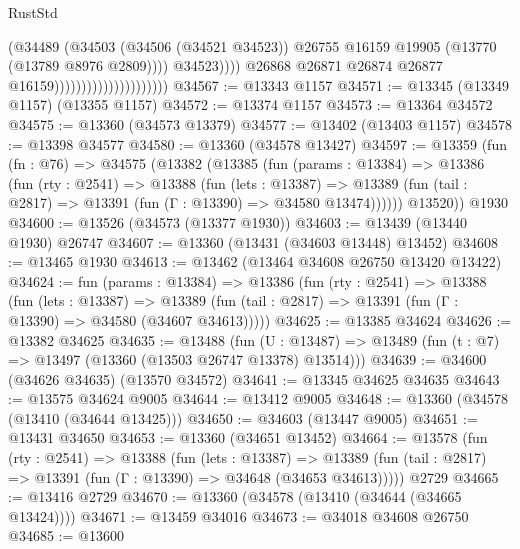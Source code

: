 \begin{lexlean}{RustStd}
\begin{coremodule}
                                                      (@34489
                                                        (@34503
                                                          (@34506 (@34521 @34523))
                                                          @26755
                                                          @16159
                                                          @19905
                                                          (@13770 (@13789 @8976 @2809))))
                                                      @34523))))
                                              @26868
                                              @26871
                                              @26874
                                              @26877
                                              @16159)))))))))))))))))))))
@34567 := @13343 @1157
@34571 := @13345 (@13349 @1157) (@13355 @1157)
@34572 := @13374 @1157
@34573 := @13364 @34572
@34575 := @13360 (@34573 @13379)
@34577 := @13402 (@13403 @1157)
@34578 := @13398 @34577
@34580 := @13360 (@34578 @13427)
@34597 := @13359
    (fun (fn : @76) =>
    @34575
      (@13382
        (@13385
          (fun (params : @13384) =>
          @13386
            (fun (rty : @2541) =>
            @13388
              (fun (lets : @13387) =>
              @13389 (fun (tail : @2817) => @13391 (fun (Γ : @13390) => @34580 @13474))))))
        @13520))
    @1930
@34600 := @13526 (@34573 (@13377 @1930))
@34603 := @13439 (@13440 @1930) @26747
@34607 := @13360 (@13431 (@34603 @13448) @13452)
@34608 := @13465 @1930
@34613 := @13462 (@13464 @34608 @26750 @13420 @13422)
@34624 := fun (params : @13384) =>
  @13386
    (fun (rty : @2541) =>
    @13388
      (fun (lets : @13387) =>
      @13389 (fun (tail : @2817) => @13391 (fun (Γ : @13390) => @34580 (@34607 @34613)))))
@34625 := @13385 @34624
@34626 := @13382 @34625
@34635 := @13488
    (fun (U : @13487) => @13489 (fun (t : @7) => @13497 (@13360 (@13503 @26747 @13378) @13514)))
@34639 := @34600 (@34626 @34635) (@13570 @34572)
@34641 := @13345 @34625 @34635
@34643 := @13575 @34624 @9005
@34644 := @13412 @9005
@34648 := @13360 (@34578 (@13410 (@34644 @13425)))
@34650 := @34603 (@13447 @9005)
@34651 := @13431 @34650
@34653 := @13360 (@34651 @13452)
@34664 := @13578
    (fun (rty : @2541) =>
    @13388
      (fun (lets : @13387) =>
      @13389 (fun (tail : @2817) => @13391 (fun (Γ : @13390) => @34648 (@34653 @34613)))))
    @2729
@34665 := @13416 @2729
@34670 := @13360 (@34578 (@13410 (@34644 (@34665 @13424))))
@34671 := @13459 @34016
@34673 := @34018 @34608 @26750
@34685 := @13600

\end{coremodule}
\end{lexlean}
